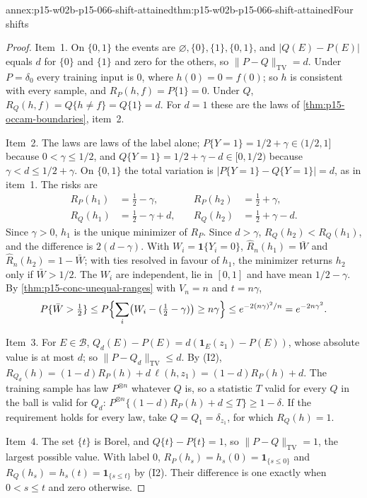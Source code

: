 \begin{annexitem}{annex:p15-w02b-p15-066-shift-attained}{thm:p15-w02b-p15-066-shift-attained}{Four shifts}
\begin{proof}
Item~1. On \(\{0,1\}\) the events are \(\varnothing,\{0\},\{1\},\{0,1\}\),
and \(|Q(E)-P(E)|\) equals \(d\) for \(\{0\}\) and \(\{1\}\) and zero for
the others, so \(\|P-Q\|_{\mathrm{TV}}=d\). Under \(P=\delta_0\) every
training input is \(0\), where \(h(0)=0=f(0)\); so \(h\) is consistent
with every sample, and \(R_P(h,f)=P\{1\}=0\). Under \(Q\),
\(R_Q(h,f)=Q\{h\ne f\}=Q\{1\}=d\). For \(d=1\) these are the laws of
\cref{thm:p15-occam-boundaries}, item~2.

Item~2. The laws are laws of the label alone; \(P\{Y=1\}=1/2+\gamma\in(1/2,1]\)
because \(0<\gamma\leq1/2\), and \(Q\{Y=1\}=1/2+\gamma-d\in[0,1/2)\)
because \(\gamma<d\leq1/2+\gamma\). On \(\{0,1\}\) the total variation is
\(|P\{Y=1\}-Q\{Y=1\}|=d\), as in item~1. The risks are
\[
 \begin{aligned}
 R_P(h_1)&=\tfrac12-\gamma,&\quad R_P(h_2)&=\tfrac12+\gamma,\\
 R_Q(h_1)&=\tfrac12-\gamma+d,&\quad R_Q(h_2)&=\tfrac12+\gamma-d .
 \end{aligned}
\]
Since \(\gamma>0\), \(h_1\) is the unique minimizer of \(R_P\). Since
\(d>\gamma\), \(R_Q(h_2)<R_Q(h_1)\), and the difference is
\(2(d-\gamma)\). With \(W_i=\mathbf1\{Y_i=0\}\),
\(\widehat R_n(h_1)=\bar W\) and \(\widehat R_n(h_2)=1-\bar W\); with
ties resolved in favour of \(h_1\), the minimizer returns \(h_2\) only
if \(\bar W>1/2\). The \(W_i\) are independent, lie in \([0,1]\) and
have mean \(1/2-\gamma\). By \cref{thm:p15-conc-unequal-ranges} with
\(V_n=n\) and \(t=n\gamma\),
\[
 P\{\bar W>\tfrac12\}\leq
 P\Bigl\{\sum_i\bigl(W_i-(\tfrac12-\gamma)\bigr)\geq n\gamma\Bigr\}
 \leq e^{-2(n\gamma)^2/n}=e^{-2n\gamma^2}.
\]

Item~3. For \(E\in\mathcal B\),
\(Q_d(E)-P(E)=d(\mathbf1_E(z_1)-P(E))\), whose absolute value is at most
\(d\); so \(\|P-Q_d\|_{\mathrm{TV}}\leq d\). By (I2),
\(R_{Q_d}(h)=(1-d)R_P(h)+d\,\ell(h,z_1)=(1-d)R_P(h)+d\). The training
sample has law \(P^{\otimes n}\) whatever \(Q\) is, so a statistic
\(T\) valid for every \(Q\) in the ball is valid for \(Q_d\):
\(P^{\otimes n}\{(1-d)R_P(h)+d\leq T\}\geq1-\delta\). If the
requirement holds for every law, take \(Q=Q_1=\delta_{z_1}\), for which
\(R_Q(h)=1\).

Item~4. The set \(\{t\}\) is Borel, and
\(Q\{t\}-P\{t\}=1\), so \(\|P-Q\|_{\mathrm{TV}}=1\), the largest
possible value. With label \(0\), \(R_P(h_s)=h_s(0)=\mathbf1_{\{s\leq0\}}\)
and \(R_Q(h_s)=h_s(t)=\mathbf1_{\{s\leq t\}}\) by (I2). Their difference
is one exactly when \(0<s\leq t\) and zero otherwise.
\end{proof}
\end{annexitem}

